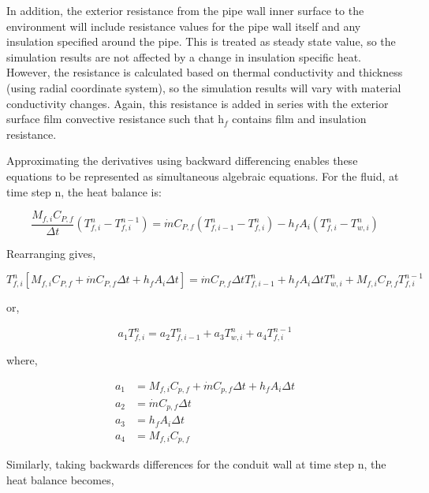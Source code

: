 In addition, the exterior resistance from the pipe wall inner surface to the environment will include resistance values for the pipe wall itself and any insulation specified around the pipe. This is treated as steady state value, so the simulation results are not affected by a change in insulation specific heat. However, the resistance is calculated based on thermal conductivity and thickness (using radial coordinate system), so the simulation results will vary with material conductivity changes. Again, this resistance is added in series with the exterior surface film convective resistance such that h\(_{f}\) contains film and insulation resistance.

Approximating the derivatives using backward differencing enables these equations to be represented as simultaneous algebraic equations. For the fluid, at time step n, the heat balance is:

\begin{equation}
\frac{{{M_{f,i}}{C_{P,f}}}}{{\Delta t}}\left( {T_{f,i}^n - T_{f,i}^{n - 1}} \right) = \dot m{C_{P,f}}\left( {T_{f,i - 1}^n - T_{f,i}^n} \right) - {h_f}{A_i}\left( {T_{f,i}^n - T_{w,i}^n} \right)
\end{equation}

Rearranging gives,

\begin{equation}
T_{f,i}^n\left[ {{M_{f,i}}{C_{P,f}} + \dot m{C_{P,f}}\Delta t + {h_f}{A_i}\Delta t} \right] = \dot m{C_{P,f}}\Delta tT_{f,i - 1}^n + {h_f}{A_i}\Delta tT_{w,i}^n + {M_{f,i}}{C_{P,f}}T_{f,i}^{n - 1}
\end{equation}

or,

\begin{equation}
{a_1}T_{f,i}^n = {a_2}T_{f,i - 1}^n + {a_3}T_{w,i}^n + {a_4}T_{f,i}^{n - 1}
\end{equation}

where,

\begin{equation}
  \begin{array}{rl}
    a_1 &= M_{f,i}C_{p,f} + \dot{m}C_{p,f} \Delta t + h_f A_i \Delta t \\
    a_2 &= \dot{m} C_{p,f} \Delta t \\ 
    a_3 &= h_f A_i \Delta t \\
    a_4 &= M_{f,i} C_{p,f}
  \end{array}
\end{equation}

Similarly, taking backwards differences for the conduit wall at time step n, the heat balance becomes,

